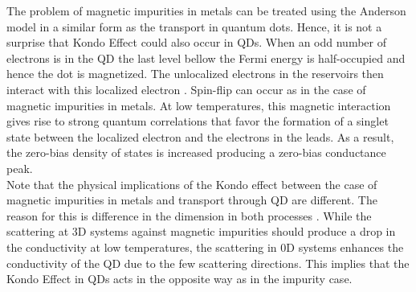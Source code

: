 The problem of magnetic impurities in metals can be treated using the Anderson model in a similar form as the transport
 in quantum dots. Hence, it is not a surprise that Kondo Effect could also occur in QDs. When an odd number of electrons is in the QD the last level bellow the Fermi energy is half-occupied and hence the dot is magnetized. The unlocalized electrons in the reservoirs then interact with this localized electron . Spin-flip can occur as in the case of  magnetic impurities in metals. At low temperatures, this magnetic  interaction gives rise to strong quantum correlations that favor the formation of a singlet state between the localized electron and the electrons in the leads. As a result, the zero-bias density of states is increased producing a zero-bias conductance peak. \\

Note that the physical implications of the Kondo effect  between the case of magnetic impurities in metals and transport through QD are different. The reason for this is difference in the dimension in both processes . While the scattering at 3D systems against magnetic impurities should produce a drop in the conductivity at low temperatures, the scattering in 0D systems enhances the conductivity of the QD due to the few scattering directions. This implies that the Kondo Effect in QDs acts in the opposite way as in the impurity case. 




















